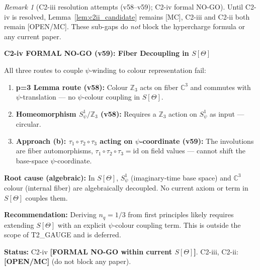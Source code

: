 \documentclass[12pt,a4paper]{article}
\theoremstyle{definition}
\theoremstyle{remark}
\newtheorem{remark}[theorem]{Remark}
\begin{document}
\begin{remark}[C2-iii resolution attempts (v58–v59); C2-iv formal NO-GO]
Until C2-iv is resolved, Lemma~\ref{lem:c2ii_candidate} remains [MC],
C2-iii and C2-ii both remain [OPEN/MC].
These sub-gaps do \emph{not} block the hypercharge formula or any current paper.

\begin{deadendbox}
\textbf{C2-iv FORMAL NO-GO (v59): Fiber Decoupling in $S[\Theta]$}

\medskip
All three routes to couple $\psi$-winding to colour representation fail:

\begin{enumerate}
  \item \textbf{p=3 Lemma route (v58):} Colour $\mathbb{Z}_3$ acts on fiber
    $\mathbb{C}^3$ and commutes with $\psi$-translation — no $\psi$-colour
    coupling in $S[\Theta]$.
  \item \textbf{Homeomorphism $S^1_\psi/\mathbb{Z}_3$ (v58):} Requires a
    $\mathbb{Z}_3$ action on $S^1_\psi$ as input — circular.
  \item \textbf{Approach (b): $\tau_1\circ\tau_2\circ\tau_3$ acting on
    $\psi$-coordinate (v59):} The involutions are fiber automorphisms,
    $\tau_1\circ\tau_2\circ\tau_3=\mathrm{id}$ on field values —
    cannot shift the base-space $\psi$-coordinate.
\end{enumerate}

\textbf{Root cause (algebraic):} In $S[\Theta]$, $S^1_\psi$ (imaginary-time
base space) and $\mathbb{C}^3$ colour (internal fiber) are algebraically
decoupled.  No current axiom or term in $S[\Theta]$ couples them.

\textbf{Recommendation:} Deriving $n_q=1/3$ from first principles likely
requires extending $S[\Theta]$ with an explicit $\psi$-colour coupling term.
This is outside the scope of T2\_GAUGE and is deferred.

\textbf{Status:} C2-iv \textbf{[FORMAL NO-GO within current $S[\Theta]$]}.
C2-iii, C2-ii: \textbf{[OPEN/MC]} (do not block any paper).
\end{deadendbox}
\end{remark}
\end{document}
